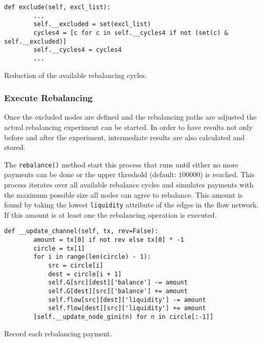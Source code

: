 \documentclass[final]{fhnwreport}       %
\begin{document}
\begin{listing}[H]
  \begin{verbatim}
def exclude(self, excl_list):
        ...
        self.__excluded = set(excl_list)
        cycles4 = [c for c in self.__cycles4 if not (set(c) & self.__excluded)]
        self.__cycles4 = cycles4
        ...
  \end{verbatim}
  \caption{Reduction of the available rebalancing cycles.}
  \label{code:reduc_cyc}
\end{listing}


\subsubsection{Execute Rebalancing}
Once the excluded nodes are defined and the rebalancing paths are adjusted the actual rebalancing experiment can be started. In order to have results not only before and after the experiment, intermediate results are also calculated and stored. 

The \texttt{rebalance()} method start this process that runs until either no more payments can be done or the upper threshold (default: $100000$) is reached. This process iterates over all available rebalance cycles and simulates payments with the maximum possible size all nodes can agree to rebalance. This amount is found by taking the lowest \texttt{liquidity} attribute of the edges in the flow network. If this amount is at least one the rebalancing operation is executed. 

\begin{listing}[H]
  \begin{verbatim}
def __update_channel(self, tx, rev=False):
        amount = tx[0] if not rev else tx[0] * -1
        circle = tx[1]
        for i in range(len(circle) - 1):
            src = circle[i]
            dest = circle[i + 1]
            self.G[src][dest]['balance'] -= amount
            self.G[dest][src]['balance'] += amount
            self.flow[src][dest]['liquidity'] -= amount
            self.flow[dest][src]['liquidity'] += amount
        [self.__update_node_gini(n) for n in circle[:-1]]
  \end{verbatim}
  \caption{Record each rebalancing payment.}
  \label{code:record}
\end{listing}
\end{document}
